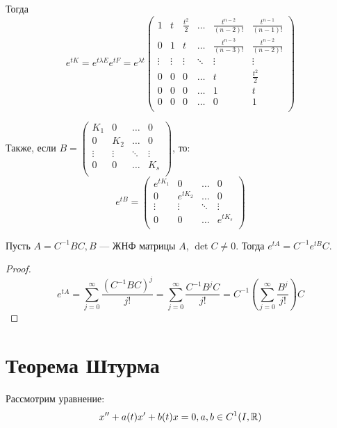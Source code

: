 Тогда 
\[e^{tK} = e^{t\lambda E} e^{tF} = e^{\lambda t}\left( \begin{array}{cccccc}
    1 & t & \frac{t^2}{2} & \dots & \frac{t^{n - 2}}{(n - 2)!} & \frac{t^{n - 1}}{(n - 1)!} \\
    0 & 1 & t & \dots & \frac{t^{n - 3}}{(n - 3)!} & \frac{t^{n - 2}}{(n - 2)!} \\
    
    \vdots & \vdots & \vdots & \ddots & \vdots &\vdots \\
    0 & 0 & 0 & \dots & t & \frac{t^2}{2} \\
    0 & 0 & 0 & \dots & 1 & t \\
    0 & 0 & 0 & \dots & 0 & 1 \\
\end{array} \right)\]

Также, если \(B = \left( \begin{array}{cccc}
    K_1 & 0 & \dots & 0 \\
    0 & K_2 & \dots & 0 \\
    \vdots & \vdots & \ddots & \vdots \\
    0 & 0 & \dots & K_s \\
\end{array} \right)\), то:
\[e^{tB} = \left( \begin{array}{cccc}
    e^{tK_1} & 0 & \dots & 0 \\
    0 & e^{tK_2} & \dots & 0 \\
    \vdots & \vdots & \ddots & \vdots \\
    0 & 0 & \dots & e^{tK_s} \\
\end{array} \right)\]

\begin{proposition}
    Пусть \(A = C^{-1}BC, B\) --- ЖНФ матрицы \(A\), \(\det C \ne 0\). Тогда \(e^{tA} = C^{-1}e^{tB}C\).
\end{proposition}
\begin{proof}
    \[e^{tA} = \sum_{j = 0}^\infty \frac{(C^{-1}BC)^j}{j!} = \sum_{j = 0}^\infty \frac{C^{-1}B^jC}{j!} = C^{-1}\left( \sum_{j = 0}^\infty \frac{B^j}{j!} \right)C\]
\end{proof}

\section{Теорема Штурма}
Рассмотрим уравнение:
\begin{equation}
    x'' + a(t)x' + b(t)x = 0, a, b \in C^1(I, \mathbb{R})
\end{equation}


